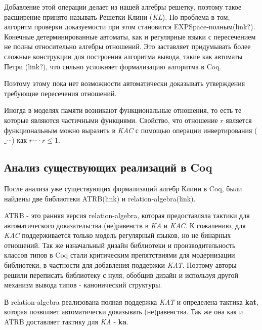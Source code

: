 \documentclass[times
              ]{itmo-student-thesis}
\begin{document}
    Добавление этой операции делает из нашей алгебры решетку, поэтому такое расширение принято называть Решетки Клини (\textit{KL}).
    Но проблема в том, алгоритм проверки доказуемости при этом становится EXPSpace-полным(link?).
    Конечные детерминированные автоматы, как и регулярные языки с пересечением не полны относительно алгебры отношений.
    Это заставляет придумывать более сложные конструкции для построения алгоритма вывода, такие как автоматы Петри (link?), что сильно усложняет формализацию алгоритма в Coq.

    Поэтому этому пока нет возможности автоматически доказывать утверждения требующие пересечения отношений.

    Иногда в моделях памяти возникают функциональные отношения, то есть те которые являются частичными функциями. Свойство, что отношение $ r $ является функциональным можно выразить в \textit{KAC} с помощью операции инвертирования ($ \_^{\smile} $) как $ r^{\smile} \cdot r \leq 1 $.

  \subsection{Анализ существующих реализаций в Coq}

    После анализа уже существующих формализаций алгебр Клини в Coq, были найдены две библиотеки ATRB(link) и relation-algebra(link).

    ATRB - это ранняя версия relation-algebra, которая предоставляла тактики для автоматического доказательства (не)равенств в \textit{KA} и \textit{KAC}.
    К сожалению, для \textit{KAC} поддерживается только модель регулярный языков, но не бинарных отношений.
    Так же изначальный дизайн библиотеки и производительность классов типов в Coq стали критическим препятствиями для модернизации библиотеки,
    в частности для добавления поддержки \textit{KAT}.
    Поэтому авторы решили переписать библиотеку с нуля, обобщив дизайн и используя другой механизм вывода типов - канонический структуры.

    В relation-algebra реализована полная поддержка \textit{KAT} и определена тактика \textbf{kat}, которая позволяет автоматически доказывать (не)равенства.
    Так же она как и ATRB доставляет тактику для \textit{KA} - \textbf{ka}.
\end{document}
